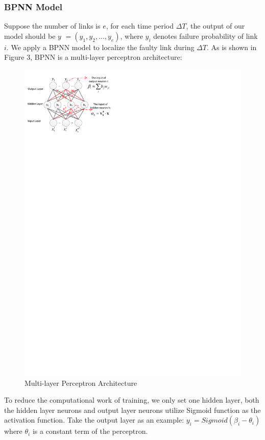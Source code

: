 \documentclass{sig-alternate-05-2015}
\begin{document}
\subsubsection*{BPNN Model}
\quad Suppose the number of links is $e$, for each time period $\Delta T$, the output of our model should be
\boldmath $y$
\unboldmath $=(y_1, y_2, ..., y_e)$, where $y_i$ denotes failure probability of link $i$. We apply a BPNN model to localize the faulty link during $\Delta T$. As is shown in Figure 3, BPNN is a multi-layer perceptron architecture:
\begin{figure}
  \centering
  \includegraphics{ANN}
  \caption{Multi-layer Perceptron Architecture}
\end{figure}
To reduce the computational work of training, we only set one hidden layer, both the hidden layer neurons and output layer neurons utilize Sigmoid function as the activation function. Take the output layer as an example:
$y_i = Sigmoid(\beta_i - \theta_i)$ where $\theta_i$ is a constant term of the perceptron.
\end{document}
